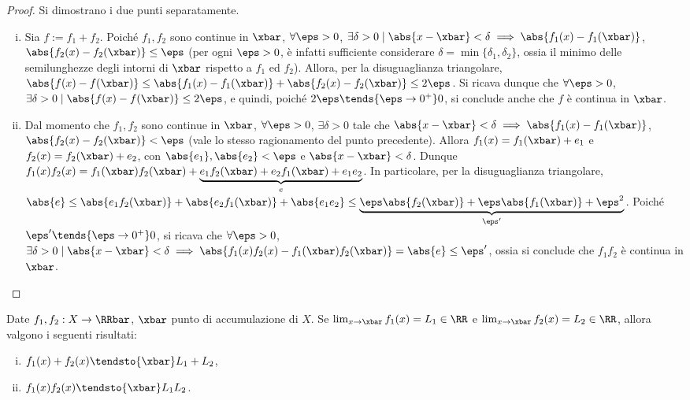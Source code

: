 \documentclass[11pt]{article}
\begin{document}
	\begin{proof}
		Si dimostrano i due punti separatamente.
		
		\begin{enumerate}[(i)]
			\item Sia $f := f_1 + f_2$. Poiché $f_1, f_2$ sono continue in $\xbar$,
			$\forall \eps > 0$, $\exists \delta > 0 \mid \abs{x - \xbar} < \delta
			\implies \abs{f_1(x) - f_1(\xbar)}$, $\abs{f_2(x) - f_2(\xbar)} \leq \eps$ (per ogni $\eps > 0$, è infatti sufficiente considerare $\delta = \min\{\delta_1, \delta_2\}$, ossia il minimo delle semilunghezze degli intorni
			di $\xbar$ rispetto a $f_1$ ed $f_2$). Allora, per la
			disuguaglianza triangolare, $\abs{f(x) - f(\xbar)} \leq
			\abs{f_1(x) - f_1(\xbar)} + \abs{f_2(x) - f_2(\xbar)} \leq 2\eps$.
			Si ricava dunque che $\forall \eps > 0$, $\exists \delta > 0
			\mid \abs{f(x) - f(\xbar)} \leq 2\eps$, e quindi, poiché
			$2\eps \tends{\eps \to 0^+} 0$, si conclude anche che $f$ è continua in $\xbar$.
			
			\item Dal momento che $f_1, f_2$ sono continue in $\xbar$,
			$\forall \eps > 0$, $\exists \delta > 0$ tale che $\abs{x - \xbar} < \delta \implies \abs{f_1(x) - f_1(\xbar)}$, $\abs{f_2(x)
			- f_2(\xbar)} < \eps$ (vale lo stesso ragionamento del punto
			precedente). Allora $f_1(x) = f_1(\xbar) + e_1$ e
			$f_2(x) = f_2(\xbar) + e_2$, con $\abs{e_1}, \abs{e_2} < \eps$
			e $\abs{x - \xbar} < \delta$.
			Dunque $f_1(x)f_2(x) = f_1(\xbar)f_2(\xbar) + \underbrace{e_1 f_2(\xbar) +
			e_2 f_1(\xbar) + e_1 e_2}_e$. In particolare, per la
			disuguaglianza triangolare, $\abs{e} \leq \abs{e_1 f_2(\xbar)} +
			\abs{e_2 f_1(\xbar)} + \abs{e_1 e_2} \leq \underbrace{\eps \abs{f_2(\xbar)} +
			\eps \abs{f_1(\xbar)} + \eps^2}_{\eps'}$. Poiché $\eps' \tends{\eps \to 0^+} 0$, si ricava che $\forall \eps > 0$, $\exists \delta > 0 \mid \abs{x - \xbar} < \delta \implies \abs{f_1(x) f_2(x) - f_1(\xbar) f_2(\xbar)} = \abs{e} \leq \eps'$, ossia si conclude che $f_1 f_2$ è continua
			in $\xbar$.
		\end{enumerate}
	\end{proof}

	\begin{proposition}
		Date $f_1, f_2 : X \to \RRbar$, $\xbar$ punto di accumulazione
		di $X$. Se $\lim_{x \to \xbar} f_1(x) = L_1 \in \RR$ e
		$\lim_{x \to \xbar} f_2(x) = L_2 \in \RR$, allora valgono
		i seguenti risultati:
		
		\begin{enumerate}[(i)]
			\item $f_1(x) + f_2(x) \tendsto{\xbar} L_1 + L_2$,
			\item $f_1(x) f_2(x) \tendsto{\xbar} L_1 L_2$.
		\end{enumerate}
	\end{proposition}
\end{document}
